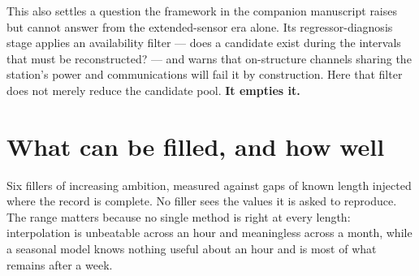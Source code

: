 \documentclass[11pt,a4paper]{article}
\begin{document}

This also settles a question the framework in the companion manuscript raises
but cannot answer from the extended-sensor era alone. Its regressor-diagnosis
stage applies an availability filter --- does a candidate exist during the
intervals that must be reconstructed? --- and warns that on-structure channels
sharing the station's power and communications will fail it by construction.
Here that filter does not merely reduce the candidate pool. \textbf{It empties
it.}

\section{What can be filled, and how well}
\label{sec:fill}

Six fillers of increasing ambition, measured against gaps of known length
injected where the record is complete. No filler sees the values it is asked to
reproduce. The range matters because no single method is right at every length:
interpolation is unbeatable across an hour and meaningless across a month, while
a seasonal model knows nothing useful about an hour and is most of what remains
after a week.
\end{document}

